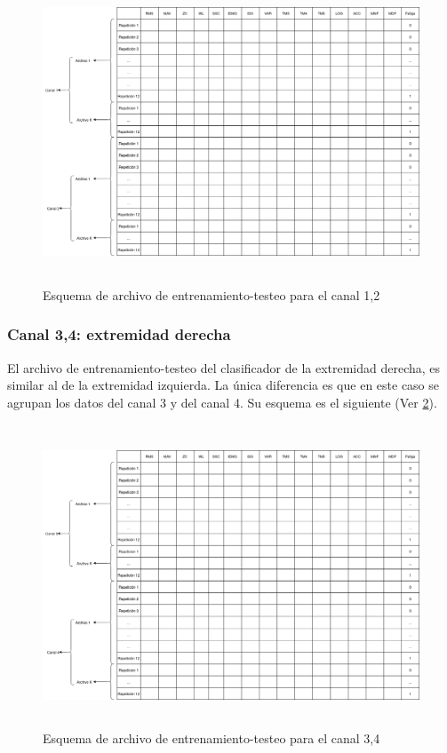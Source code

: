         \begin{figure}[!ht]
        
        \includegraphics[width=1.0\textwidth,height=9cm]{imagenes/canal 12.png}
        \caption{ Esquema de archivo de entrenamiento-testeo para el canal 1,2}
        \label{fig:canal12}
        \end{figure}
        
        
        \newpage
        \subsubsection{Canal 3,4: extremidad derecha}
        El archivo de entrenamiento-testeo del clasificador de la extremidad derecha, es similar al de la extremidad izquierda. La única diferencia es que en este caso se agrupan los datos del canal 3 y del canal 4. Su esquema es el siguiente (Ver \ref{fig:canal34}).
        \begin{figure}[!ht]
        \centering
        \includegraphics[width=1.0\textwidth,height=9cm]{imagenes/canal 34.png}
        \caption{ Esquema de archivo de entrenamiento-testeo para el canal 3,4}
        \label{fig:canal34}
        \end{figure}
        
